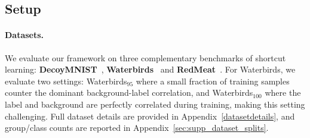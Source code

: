 \subsection{Setup}
\label{sec:setup}

\paragraph{Datasets.}
We evaluate our framework on three complementary benchmarks of shortcut learning: \textbf{DecoyMNIST}~\cite{erion2021improving},
\textbf{Waterbirds}~\cite{sagawa2019distributionally} and 
\textbf{RedMeat}~\cite{petryk2022guiding}. For Waterbirds, we evaluate two settings: Waterbirds$_{95}$ where a small fraction of training samples counter the dominant background-label correlation, and Waterbirds$_{100}$ where the label and background are perfectly correlated during training, making this setting challenging. Full dataset details are provided in Appendix~\ref{datasetdetails}, and group/class counts are reported in Appendix~\ref{sec:supp_dataset_splits}.

